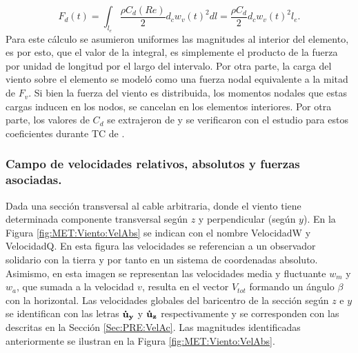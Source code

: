 \begin{equation}
	\label{Eq:MET:FuerzaViento}
	F_d(t)=\int_{l_e}\frac{\rho C_d(Re)}{2}{d_c w_v(t)^2} dl= \frac{\rho C_d}{2}d_c w_v(t)^2l_{e}.
\end{equation}
Para este cálculo se asumieron uniformes las magnitudes al interior del elemento, es por esto, que el valor de la integral, es simplemente el producto de la fuerza por unidad de longitud por el largo del intervalo. Por otra parte, la carga del viento sobre el elemento se modeló como una fuerza nodal equivalente a la mitad de $F_v$. Si bien la fuerza del viento es distribuida, los momentos nodales que estas cargas inducen en los nodos, se cancelan en los elementos interiores. Por otra parte, los valores de $C_d$ se extrajeron de \citep{Foti2016} y se verificaron con el estudio para estos coeficientes durante TC de \citep{mara2007effects}. 

\subsubsection{Campo de velocidades relativos, absolutos y fuerzas asociadas.}\label{SubSec:MET:CampoVelRealt}
Dada una sección transversal al cable arbitraria, donde el viento tiene determinada componente transversal según $z$ y perpendicular (según $y$). En la Figura \ref{fig:MET:Viento:VelAbs} se indican con el nombre \gls{VelocidadW} y \gls{VelocidadQ}. En esta figura las velocidades se referencian a un observador solidario con la tierra y por tanto en un sistema de coordenadas absoluto. Asimismo, en esta imagen se representan las velocidades media y fluctuante $w_m$ y $w_a$, que sumada a la velocidad $v$, resulta en el vector $V_{tot}$ formando un ángulo $\beta$ con la horizontal. Las velocidades globales del baricentro de la sección según $z$ e $y$ se identifican con las letras $\bf{\dot{u}}_{y}$ y $\bf{\dot{u}}_{z}$ respectivamente y se corresponden con las descritas en la Sección \ref{Sec:PRE:VelAc}. Las magnitudes identificadas anteriormente se ilustran en la Figura \ref{fig:MET:Viento:VelAbs}.
% 

